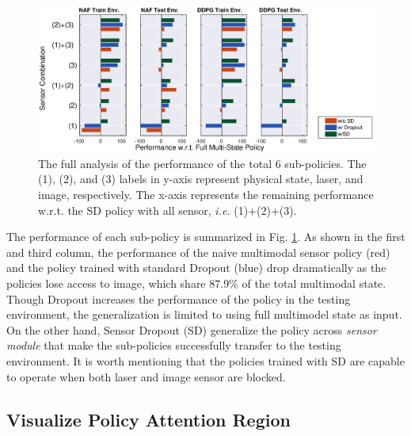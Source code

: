 \documentclass[../thesis.tex]{subfiles}
\begin{document}
\begin{figure}[t]
\vskip -0.1in
\centering
\includegraphics[width=\columnwidth]{./MultimodalDRL/fig/all_policy}
\caption{The full analysis of the performance of the total $6$ sub-policies. The (1), (2), and (3) labels in y-axis represent physical state, laser, and image, respectively. The x-axis represents the remaining performance w.r.t. the SD policy with all sensor, \textit{i.e.} (1)+(2)+(3).}
\label{fig:full-sd-policy}
\vskip -0.1in
\end{figure} 

The performance of each sub-policy is summarized in Fig. \ref{fig:full-sd-policy}. 
As shown in the first and third column, the performance of the naive multimodal sensor policy (red) and the policy trained with standard Dropout (blue) drop dramatically as the policies lose access to image, which share $87.9\%$ of the total multimodal state. Though Dropout increases the performance of the policy in the testing environment, the generalization is limited to using full multimodel state  as input. On the other hand, Sensor Dropout (SD) generalize the policy across \textit{sensor module} that make the sub-policies successfully transfer to the testing environment. It is worth mentioning that the policies trained with SD are capable to operate when both laser and image sensor are blocked.


\subsection{Visualize Policy Attention Region}
\end{document}
